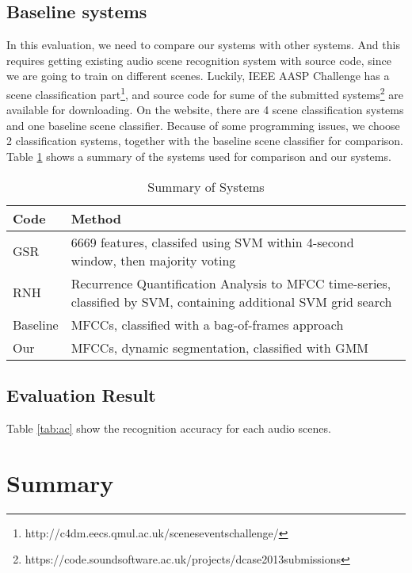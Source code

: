\subsection{Baseline systems}
In this evaluation, we need to compare our systems with other systems. 
And this requires getting existing audio scene recognition system with source code, since we are going to train on different scenes. 
Luckily, IEEE AASP Challenge has a scene classification part\footnote{http://c4dm.eecs.qmul.ac.uk/sceneseventschallenge/}, and source code for sume of the submitted systems\footnote{https://code.soundsoftware.ac.uk/projects/dcase2013submissions} are available for downloading. 
On the website, there are 4 scene classification systems and one baseline scene classifier. 
Because of some programming issues, we choose 2 classification systems, together with the baseline scene classifier for comparison. 
Table \ref{tab:systems} shows a summary of the systems used for comparison and our systems. 

\begin{table}[htb]
\caption{Summary of Systems}
\begin{tabular}{ll}
\hline
 Code & Method \\
\hline
 GSR & 6669 features, classifed using SVM within 4-second window, then majority voting \\
 RNH & Recurrence Quantification Analysis to MFCC time-series, classified by SVM, containing additional SVM grid search \\ 
 Baseline & MFCCs, classified with a bag-of-frames approach \\ 
 Our & MFCCs, dynamic segmentation, classified with GMM \\ 
\hline
\end{tabular}
\label{tab:systems}
\end{table}

\subsection{Evaluation Result}
Table \ref{tab:ac} show the recognition accuracy for each audio scenes. 

\begin{table}[htbp]
\centering
{}
\caption{Recognition Accuracy for 10 Audio Scenes}
\label{tab:ac}
\end{table}


\section{Summary}
